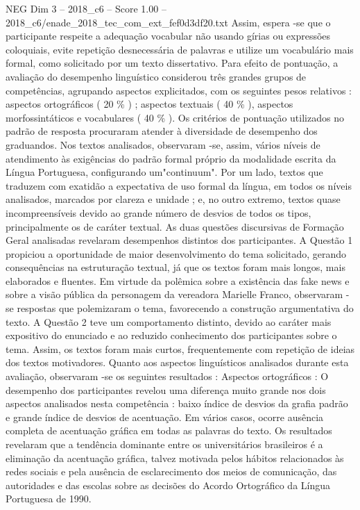 \begin{textsample}{NEG Dim 3 – 2018\_c6 – Score 1.00 – 2018\_c6/enade\_2018\_tec\_com\_ext\_fef0d3df20.txt}
Assim, espera -se que o participante respeite a adequação vocabular não usando gírias ou expressões coloquiais, evite repetição desnecessária de palavras e utilize um vocabulário mais formal, como solicitado por um texto dissertativo.
Para efeito de pontuação, a avaliação do desempenho linguístico considerou três grandes grupos de competências, agrupando aspectos explicitados, com os seguintes pesos relativos : aspectos ortográficos ( 20 \% ) ; aspectos textuais ( 40 \% ), aspectos morfossintáticos e vocabulares ( 40 \% ).
Os critérios de pontuação utilizados no padrão de resposta procuraram atender à diversidade de desempenho dos graduandos.
Nos textos analisados, observaram -se, assim, vários níveis de atendimento às exigências do padrão formal próprio da modalidade escrita da Língua Portuguesa, configurando um"continuum".
Por um lado, textos que traduzem com exatidão a expectativa de uso formal da língua, em todos os níveis analisados, marcados por clareza e unidade ; e, no outro extremo, textos quase incompreensíveis devido ao grande número de desvios de todos os tipos, principalmente os de caráter textual.
As duas questões discursivas de Formação Geral analisadas revelaram desempenhos distintos dos participantes.
A Questão 1 propiciou a oportunidade de maior desenvolvimento do tema solicitado, gerando consequências na estruturação textual, já que os textos foram mais longos, mais elaborados e fluentes.
Em virtude da polêmica sobre a existência das fake news e sobre a visão pública da personagem da vereadora Marielle Franco, observaram -se respostas que polemizaram o tema, favorecendo a construção argumentativa do texto.
A Questão 2 teve um comportamento distinto, devido ao caráter mais expositivo do enunciado e ao reduzido conhecimento dos participantes sobre o tema.
Assim, os textos foram mais curtos, frequentemente com repetição de ideias dos textos motivadores.
Quanto aos aspectos linguísticos analisados durante esta avaliação, observaram -se os seguintes resultados : Aspectos ortográficos : O desempenho dos participantes revelou uma diferença muito grande nos dois aspectos analisados nesta competência : baixo índice de desvios da grafia padrão e grande índice de desvios de acentuação.
Em vários casos, ocorre ausência completa de acentuação gráfica em todas as palavras do texto.
Os resultados revelaram que a tendência dominante entre os universitários brasileiros é a eliminação da acentuação gráfica, talvez motivada pelos hábitos relacionados às redes sociais e pela ausência de esclarecimento dos meios de comunicação, das autoridades e das escolas sobre as decisões do Acordo Ortográfico da Língua Portuguesa de 1990.

\end{textsample}
